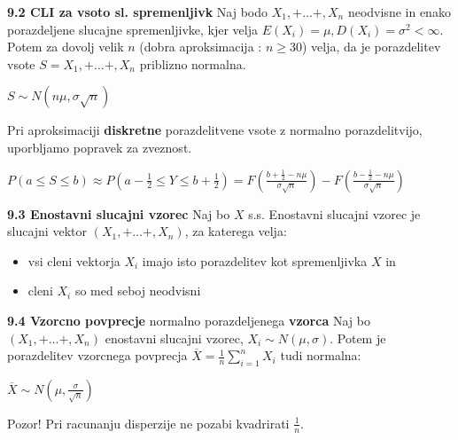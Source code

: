 \documentclass{article}
\begin{document}
\begin{multicols}{2}
\textbf{9.2 CLI za vsoto sl. spremenljivk}
Naj bodo $X_1, + \dots +, X_n$ neodvisne in enako porazdeljene
slucajne spremenljivke, kjer velja $E(X_i) = \mu, D(X_i) = \sigma^2 < \infty$. Potem za 
dovolj velik $n$ (dobra aproksimacija : $n \geq 30$)  velja, da je porazdelitev vsote
$S = X_1, + \dots +, X_n$ priblizno normalna.

\begin{center}
    \begin{math}
        S \sim  N(n \mu, \sigma \sqrt{n})
    \end{math}
\end{center}

Pri aproksimaciji \textbf{diskretne} porazdelitvene vsote z normalno porazdelitvijo, uporbljamo
popravek za zveznost.

\begin{center}
    \begin{math}
        P(a \leq S \leq b) \approx P(a - \frac{1}{2} \leq Y \leq b + \frac{1}{2}) =
        F(
            \frac{b + \frac{1}{2} - n \mu}{\sigma \sqrt{n}}
        ) -
        F(
            \frac{b - \frac{1}{2} - n \mu}{\sigma \sqrt{n}}
        )
    \end{math}
\end{center}

\textbf{9.3 Enostavni slucajni vzorec}
Naj bo $X$ s.s. Enostavni slucajni vzorec je slucajni vektor $(X_1, + \dots +, X_n)$,
za katerega velja:
\begin{itemize}
    \item vsi cleni vektorja $X_i$ imajo isto porazdelitev kot spremenljivka $X$ in
    \item cleni $X_i$ so med seboj neodvisni
\end{itemize}

\textbf{9.4 Vzorcno povprecje} normalno porazdeljenega \textbf{vzorca}
Naj bo  $(X_1, + \dots +, X_n)$ enostavni slucajni vzorec, $X_i \sim N(\mu, \sigma)$.
Potem je porazdelitev vzorcnega povprecja $\overline{X} = \frac{1}{n} \sum_{i = 1}^{n} X_i$
tudi normalna:
\begin{center}
    \begin{math}
        \overline{X} \sim N(\mu, \frac{\sigma}{\sqrt{n}})
    \end{math}
\end{center}

Pozor! Pri racunanju disperzije ne pozabi kvadrirati \textbf{$\frac{1}{n}$}.


\end{multicols}
\end{document}

